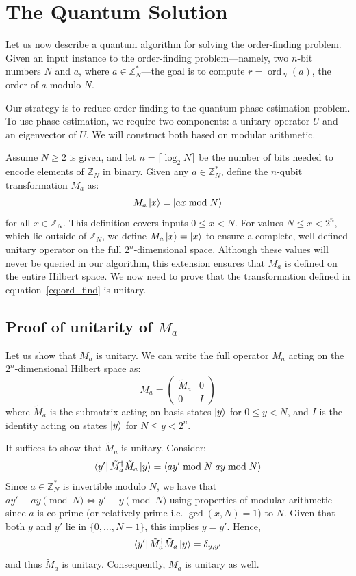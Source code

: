 \section{The Quantum Solution}

Let us now describe a quantum algorithm for solving the order-finding problem. Given an input instance to the order-finding problem—namely, two $n$-bit numbers $N$ and $a$, where $a \in \mathbb{Z}_N^*$—the goal is to compute $r = \operatorname{ord}_N(a)$, the order of $a$ modulo $N$.

Our strategy is to reduce order-finding to the quantum phase estimation problem. To use phase estimation, we require two components: a unitary operator $U$ and an eigenvector of $U$. We will construct both based on modular arithmetic.

Assume $N \geq 2$ is given, and let $n = \lceil \log_2 N \rceil$ be the number of bits needed to encode elements of $\mathbb{Z}_N$ in binary. Given any $a \in \mathbb{Z}_N^*$, define the $n$-qubit transformation $M_a$ as:
\begin{equation}
M_a \ket{x} = \ket{a x \bmod N}
\label{eq:ord_find}
\end{equation}
for all $x \in \mathbb{Z}_N$. This definition covers inputs $0 \leq x < N$. For values $N \leq x < 2^n$, which lie outside of $\mathbb{Z}_N$, we define $M_a \ket{x} = \ket{x}$ to ensure a complete, well-defined unitary operator on the full $2^n$-dimensional space. Although these values will never be queried in our algorithm, this extension ensures that $M_a$ is defined on the entire Hilbert space. We now need to prove that the transformation defined in equation~\eqref{eq:ord_find} is unitary.

\subsection*{Proof of unitarity of $M_a$}
Let us show that $M_a$ is unitary. We can write the full operator $M_a$ acting on the $2^n$-dimensional Hilbert space as:
\[
M_a = \begin{pmatrix}
    \tilde{M}_a & 0 \\
    0 & I
\end{pmatrix}
\]
where $\tilde{M}_a$ is the submatrix acting on basis states $\ket{y}$ for $0 \leq y < N$, and $I$ is the identity acting on states $\ket{y}$ for $N \leq y < 2^n$.

It suffices to show that $\tilde{M}_a$ is unitary. Consider:
\[
\bra{y'} \tilde{M}_a^\dagger \tilde{M}_a \ket{y} = \braket{a y' \bmod N | a y \bmod N}
\]
Since $a \in \mathbb{Z}_N^*$ is invertible modulo $N$, we have that $a y' \equiv a y \pmod{N} \iff y' \equiv y \pmod{N}$ using properties of modular arithmetic since $a$ is co-prime (or relatively prime i.e. $\gcd(x,N)=1$) to $N$. Given that both $y$ and $y'$ lie in $\{0, \dots, N-1\}$, this implies $y = y'$. Hence,
\[
\bra{y'} \tilde{M}_a^\dagger \tilde{M}_a \ket{y} = \delta_{y, y'}
\]
and thus $\tilde{M}_a$ is unitary. Consequently, $M_a$ is unitary as well.

